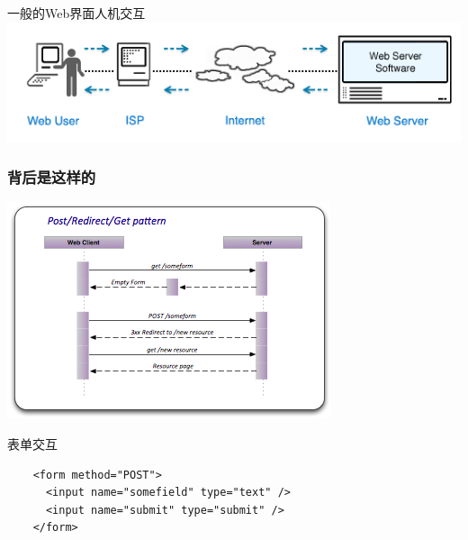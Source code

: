 \documentclass{beamer}
\begin{document}
\begin{frame}[plain]
	\begin{center}
	一般的Web界面人机交互\\
	\includegraphics[width=\textwidth]{images/web-browser-and-server-interaction.png}
	\end{center}
\end{frame}

\begin{frame}[fragile]
	\frametitle{背后是这样的}
	\begin{center}
	\includegraphics[width=.6\textwidth]{images/Basic-Post-Redirect-Get.png}
	\end{center}
	\pause
	表单交互\\
	\begin{tiny}
	\begin{verbatim}
	<form method="POST">
	  <input name="somefield" type="text" />
	  <input name="submit" type="submit" />
	</form>
	\end{verbatim}
	\end{tiny}
\end{frame}
\end{document}
